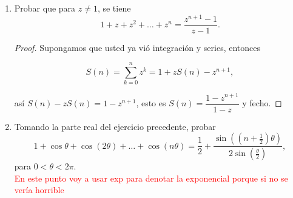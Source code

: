 \documentclass[11pt]{article}
\begin{document}
\begin{enumerate}
    \begin{proof}
    Escribimos $z=a+bi$ e igualamos a 0, así, para el seno tenemos:
    \begin{align*}
    \sin{z}=\dfrac{e^{iz}-e^{-iz}}{2i}&=0\\
    e^{i(a+bi)}-e^{-i(a+bi)}&=0\\
    e^{-b+ai}-e^{b-ai}&=0\\ 
    e^{-b+ai}&=e^{b-ai}\\ 
    e^{-b}e^{ai}&=e^{b}e^{-ai}\\ 
    e^{2ai}&=e^{2b}
    \end{align*}
    
    Como $|e^{2ai}|=|e^2b|=1$ y además $2b$ es un número real, tenemos que $e^2b=1$ y por la inyectividad de la exponencial en los reales, $b=0$, luego resolvemos la ecuación
    \[
    e^{2ai}=1
    \]
    Es decir \[
    e^{ai}=\pm 1
    \]
    Si hace las cuentas va a ver que los ceros de esa vaina son el conjunto $A=\{\theta\in\mathbb{R}: \theta=k\pi, k\in\mathbb{Z}\}$.

    Para el coseno la cuenta es basicamente la misma pero la ecuación al final es
    \[
    e^{2ai}=-e^{2b}
    \]
    Y pues resolviendo de la misma manera se llega a que los ceros son el conjunto $B=\{\theta\in\mathbb{R}:\theta=\frac{\pi}{2}+k\pi, k\in\mathbb{Z}\}$

    \end{proof}

    \item Probar que para $z \neq 1$, se tiene
    \[
    1 + z + z^2 + \dots + z^n = \dfrac{z^{n+1} - 1}{z - 1}.
    \]

    \begin{proof}
    Supongamos que usted ya vió integración y series, entonces

    $$S(n)=\sum_{k=0}^{n} z^k=1+zS(n)-z^{n+1},$$

    así $S(n)-zS(n)=1-z^{n+1}$, esto es $S(n)=\dfrac{1-z^{n+1}}{1-z}$ y fecho. 
    \end{proof}

    \item Tomando la parte real del ejercicio precedente, probar
    \[
    1 + \cos \theta + \cos(2\theta) + \dots + \cos(n\theta) = \frac{1}{2} + \frac{\sin\left((n + \frac{1}{2})\theta\right)}{2 \sin\left(\frac{\theta}{2}\right)},
    \]
    para $0 < \theta < 2\pi$.\\

    \textcolor{red}{En este punto voy a usar exp para denotar la exponencial porque si no se vería horrible}


\end{enumerate}
\end{document}
